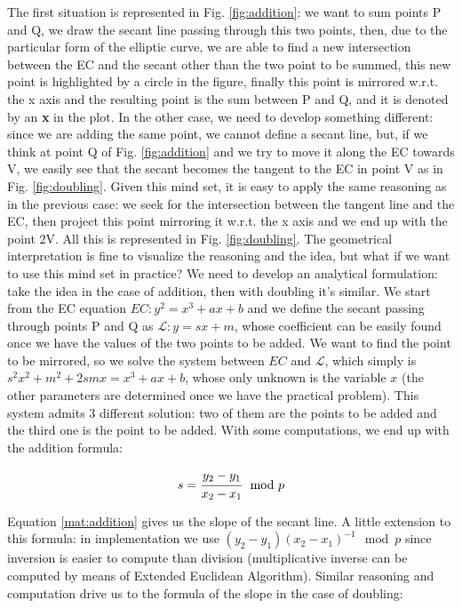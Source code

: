 \documentclass{article}
\begin{document}
The first situation is represented in Fig. \ref{fig:addition}: we want to sum points P and Q, we draw the secant line passing through this two points, then, due to the particular form of the elliptic curve, we are able to find a new intersection between the EC and the secant other than the two point to be summed, this new point is highlighted by a circle in the figure, finally this point is mirrored w.r.t. the x axis and the resulting point is the sum between P and Q, and it is denoted by an \textbf{x} in the plot.\newline
In the other case, we need to develop something different: since we are adding the same point, we cannot define a secant line, but, if we think at point Q of Fig. \ref{fig:addition} and we try to move it along the EC towards V, we easily see that the secant becomes the tangent to the EC in point V as in Fig. \ref{fig:doubling}. Given this mind set, it is easy to apply the same reasoning as in the previous case: we seek for the intersection between the tangent line and the EC, then project this point mirroring it w.r.t. the x axis and we end up with the point 2V. All this is represented in Fig. \ref{fig:doubling}. \newline
The geometrical interpretation is fine to visualize the reasoning and the idea, but what if we want to use this mind set in practice? We need to develop an analytical formulation: take the idea in the case of addition, then with doubling it's similar. We start from the EC equation $EC: y^2 = x^3 + ax +b$ and we define the secant passing through points P and Q as $\mathcal{L}: y = sx + m$, whose coefficient can be easily found once we have the values of the two points to be added. We want to find the point to be mirrored, so we solve the system between $EC$ and $\mathcal{L}$, which simply is $s^2x^2 + m^2 + 2smx =  x^3 + ax +b$, whose only unknown is the variable $x$ (the other parameters are determined once we have the practical problem). This system admits 3 different solution: two of them are the points to be added and the third one is the point to be added. With some computations, we end up with the addition formula:

\begin{equation}
	s = \cfrac{y_2 - y_1}{x_2 - x_1} \mod p
	\label{mat:addition}
\end{equation}

Equation \ref{mat:addition} gives us the slope of the secant line. A little extension to this formula: in implementation we use $(y_2 - y_1)(x_2 - x_1)^{-1} \mod p$ since inversion is easier to compute than division (multiplicative inverse can be computed by means of Extended Euclidean Algorithm). Similar reasoning and computation drive us to the formula of the slope in the case of doubling:
\end{document}
